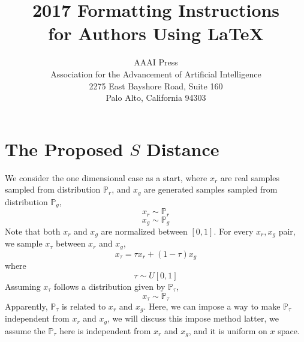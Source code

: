 \documentclass[letterpaper]{article} %
\begin{document}
%
\title{2017 Formatting Instructions \\for Authors Using \LaTeX{}}
\author{AAAI Press\\
Association for the Advancement of Artificial Intelligence\\
2275 East Bayshore Road, Suite 160\\
Palo Alto, California 94303\\
}
\maketitle
\begin{abstract}
\end{abstract}

\section{The Proposed $S$ Distance}
We consider the one dimensional case as a start, where $x_{r}$ are real samples sampled from distribution $\mathbb{P}_{r}$, and $x_{g}$ are generated samples sampled from distribution $\mathbb{P}_{g}$,
\begin{equation}\label{x-r}
   x_{r} \sim \mathbb{P}_{r}
\end{equation}
\begin{equation}\label{x-g}
  x_{g} \sim \mathbb{P}_{g}
\end{equation}
Note that both $x_{r}$ and $x_{g}$ are normalized between $[0,1]$. For every $x_{r}, x_{g}$ pair, we sample $x_{\tau}$ between $x_{r}$ and $x_g$,
\begin{equation}\label{x-epsilon}
  x_{\tau} = \tau x_{r} + (1-\tau) x_g
\end{equation}
where
\begin{equation}\label{epsilon}
  \tau \sim U[0,1]
\end{equation}
Assuming $x_{\tau}$ follows a distribution given by $\mathbb{P}_{\tau}$,
\begin{equation}\label{x-epsilon}
  x_{\tau} \sim \mathbb{P}_{\tau}
\end{equation}
Apparently, $\mathbb{P}_{\tau}$ is related to $x_r$ and $x_g$. Here, we can impose a way to make $\mathbb{P}_{\tau}$ independent from $x_r$ and $x_g$, we will discuss this impose method latter, we assume the $\mathbb{P}_{\tau}$ here is independent from $x_r$ and $x_g$, and it is uniform on $x$ space.
\end{document}
